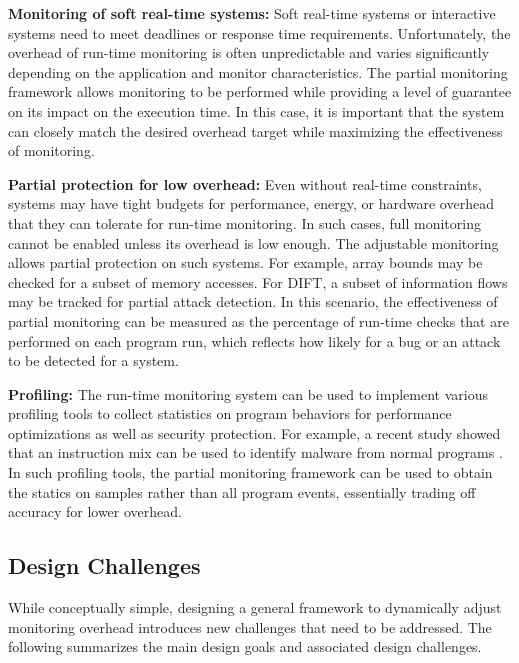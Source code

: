 {\bf Monitoring of soft real-time systems:}
Soft real-time systems or interactive systems need to meet deadlines or response
time requirements. Unfortunately, the overhead of run-time monitoring is often 
unpredictable and varies significantly depending on the application and monitor
characteristics. The partial monitoring framework allows monitoring to be performed
while providing a level of guarantee on its impact on the execution time. 
In this case, it is important that the system can closely match the desired
overhead target while maximizing the effectiveness of monitoring.

{\bf Partial protection for low overhead:}
Even without real-time constraints, systems may have tight budgets for performance,
energy, or hardware overhead that they can tolerate for run-time monitoring. In such cases,
full monitoring cannot be enabled unless its overhead is low enough. The adjustable
monitoring allows partial protection on such systems. For example, array bounds
may be checked for a subset of memory accesses. For DIFT, a subset of information flows
may be tracked for partial attack detection. In this scenario, the effectiveness of 
partial monitoring can be measured as the percentage of run-time checks that are
performed on each program run, which reflects how likely for a bug or an attack 
to be detected for a system. 

{\bf Profiling:} 
The run-time monitoring system can be used to implement various profiling tools
to collect statistics on program behaviors for performance optimizations as well
as security protection. For example, a recent study showed that an instruction
mix can be used to identify malware from normal programs \cite{demme-isca13, tang-raid14}. 
In such profiling tools, the partial monitoring framework can be used to obtain
the statics on samples rather than all program events, essentially trading off
accuracy for lower overhead.

\subsection{Design Challenges}

While conceptually simple, designing a general framework to dynamically adjust monitoring
overhead introduces new challenges that need to be addressed.  
The following summarizes the main design goals and associated design challenges.

